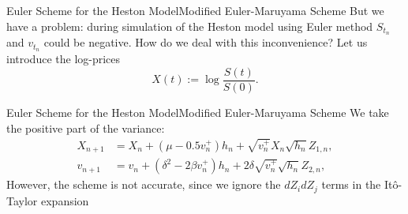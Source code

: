 \begin{frame}{Euler Scheme for the Heston Model}{Modified Euler-Maruyama Scheme}
    But we have a problem: during simulation of the Heston model using Euler method $S_{t_n}$ and $v_{t_n}$ could be negative. How do we deal with this inconvenience?
    Let us introduce the log-prices
    \begin{equation}
        X(t) := \log\frac{S(t)}{S(0)}.
    \end{equation}
\end{frame}

\begin{frame}{Euler Scheme for the Heston Model}{Modified Euler-Maruyama Scheme}
    We take the positive part of the variance:
    \begin{align}
        X_{n+1} & = X_n + (\mu - 0.5 v_n^+)h_n + \sqrt{v_n^+} X_n \sqrt{h_n} Z_{1,n}, \label{Euler:Heston:price:posmod}\\
        v_{n+1} & = v_n + \left(\delta^2 - 2\beta v_n^+\right) h_n + 2\delta \sqrt{v_n^+} \sqrt{h_n} Z_{2,n}, \label{Euler:Heston:variance:posmod}
    \end{align}
    However, the scheme is not accurate, since we ignore the $dZ_idZ_j$ terms in the It\^o-Taylor expansion
\end{frame}